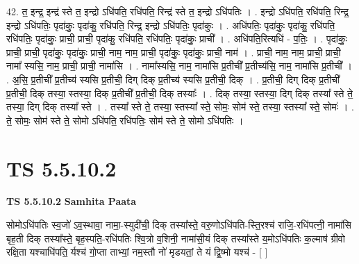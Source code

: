 \documentclass[17pt]{extarticle}
\begin{document}
42. त॒ इन्द्र॒ इन्द्र॑ स्ते त॒ इन्द्रो ऽधि॑पति॒ रधि॑पति॒ रिन्द्र॑ स्ते त॒ इन्द्रो ऽधि॑पतिः । . इन्द्रो ऽधि॑पति॒ रधि॑पति॒ रिन्द्र॒ इन्द्रो ऽधि॑पतिः॒ पृदा॑कुः॒ पृदा॑कु॒ रधि॑पति॒ रिन्द्र॒ इन्द्रो ऽधि॑पतिः॒ पृदा॑कुः । . अधि॑पतिः॒ पृदा॑कुः॒ पृदा॑कु॒ रधि॑पति॒ रधि॑पतिः॒ पृदा॑कुः॒ प्राची॒ प्राची॒ पृदा॑कु॒ रधि॑पति॒ रधि॑पतिः॒ पृदा॑कुः॒ प्राची᳚ । . अधि॑पति॒रित्यधि॑ - प॒तिः॒ । . पृदा॑कुः॒ प्राची॒ प्राची॒ पृदा॑कुः॒ पृदा॑कुः॒ प्राची॒ नाम॒ नाम॒ प्राची॒ पृदा॑कुः॒ पृदा॑कुः॒ प्राची॒ नाम॑ । . प्राची॒ नाम॒ नाम॒ प्राची॒ प्राची॒ नामा᳚ स्यसि॒ नाम॒ प्राची॒ प्राची॒ नामा॑सि । . नामा᳚स्यसि॒ नाम॒ नामा॑सि प्र॒तीची᳚ प्र॒तीच्य॑सि॒ नाम॒ नामा॑सि प्र॒तीची᳚ । . अ॒सि॒ प्र॒तीची᳚ प्र॒तीच्य॑ स्यसि प्र॒तीची॒ दिग् दिक् प्र॒तीच्य॑ स्यसि प्र॒तीची॒ दिक् । . प्र॒तीची॒ दिग् दिक् प्र॒तीची᳚ प्र॒तीची॒ दिक् तस्या॒ स्तस्या॒ दिक् प्र॒तीची᳚ प्र॒तीची॒ दिक् तस्याः᳚ । . दिक् तस्या॒ स्तस्या॒ दिग् दिक् तस्या᳚ स्ते ते॒ तस्या॒ दिग् दिक् तस्या᳚ स्ते । . तस्या᳚ स्ते ते॒ तस्या॒ स्तस्या᳚ स्ते॒ सोमः॒ सोम॑ स्ते॒ तस्या॒ स्तस्या᳚ स्ते॒ सोमः॑ । . ते॒ सोमः॒ सोम॑ स्ते ते॒ सोमो ऽधि॑पति॒ रधि॑पतिः॒ सोम॑ स्ते ते॒ सोमो ऽधि॑पतिः । \newline
\pagebreak
{}

\section{ TS 5.5.10.2 }

\textbf{TS 5.5.10.2 } \newline
\textbf{Samhita Paata} \newline

सोमोऽधि॑पतिः स्व॒जो॑ ऽव॒स्थावा॒ नामा॒-स्युदी॑ची॒ दिक् तस्या᳚स्ते॒ वरु॒णोऽधि॑पति-स्ति॒रश्च॑ राजि॒-रधि॑पत्नी॒ नामा॑सि बृह॒ती दिक् तस्या᳚स्ते॒ बृह॒स्पति॒-रधि॑पतिः श्वि॒त्रो व॒शिनी॒ नामा॑सी॒यं दिक् तस्या᳚स्ते य॒मोऽधि॑पतिः क॒ल्माष॑ ग्रीवो रक्षि॒ता यश्चाधि॑पति॒ र्यश्च॑ गो॒प्ता ताभ्यां॒ नम॒स्तौ नो॑ मृडयतां॒ ते यं द्वि॒ष्मो यश्च॑ - [  ] \newline
\end{document}
